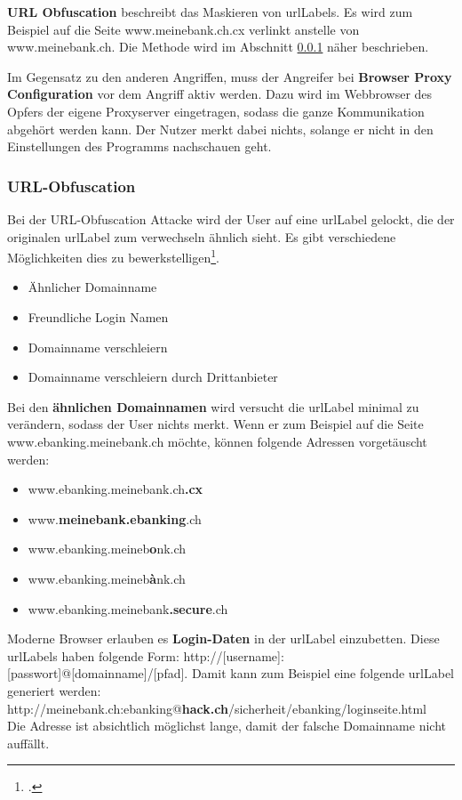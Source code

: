 \textbf{URL Obfuscation} beschreibt das Maskieren von \Glspl{urlLabel}. Es wird zum Beispiel auf die Seite www.meinebank.ch.cx verlinkt anstelle von www.meinebank.ch. Die Methode wird im Abschnitt \ref{sec:phishing:angriffvorbereiten:attacken:urlobfuscationattacke} näher beschrieben.

Im Gegensatz zu den anderen Angriffen, muss der Angreifer bei \textbf{Browser Proxy Configuration} vor dem Angriff aktiv werden. Dazu wird im Webbrowser des Opfers der eigene Proxyserver eingetragen, sodass die ganze Kommunikation abgehört werden kann. Der Nutzer merkt dabei nichts, solange er nicht in den Einstellungen des Programms nachschauen geht.

\subsubsection{URL-Obfuscation}
\label{sec:phishing:angriffvorbereiten:attacken:urlobfuscationattacke}
Bei der URL-Obfuscation Attacke wird der User auf eine \Gls{urlLabel} gelockt, die der originalen \Gls{urlLabel} zum verwechseln ähnlich sieht. Es gibt verschiedene Möglichkeiten dies zu bewerkstelligen\footcite{NISR-WP-Phishingv101doc_2015-06-29}.
\begin{itemize}
\item Ähnlicher Domainname 
\item Freundliche Login Namen
\item Domainname verschleiern
\item Domainname verschleiern durch Drittanbieter
\end{itemize}

Bei den \textbf{ähnlichen Domainnamen} wird versucht die \Gls{urlLabel} minimal zu verändern, sodass der User nichts merkt. Wenn er zum Beispiel auf die Seite www.ebanking.meinebank.ch möchte, können folgende Adressen vorgetäuscht werden:
\begin{itemize}
\item www.ebanking.meinebank.ch\textbf{.cx}
\item www.\textbf{meinebank.ebanking}.ch
\item www.ebanking.meineb\textbf{o}nk.ch
\item www.ebanking.meineb\textbf{{à}}nk.ch
\item www.ebanking.meinebank\textbf{.secure}.ch
\end{itemize}

Moderne Browser erlauben es \textbf{Login-Daten} in der \Gls{urlLabel} einzubetten. Diese \Glspl{urlLabel} haben folgende Form: http://[username]:[passwort]@[domainname]/[pfad]. Damit kann zum Beispiel eine folgende \Gls{urlLabel} generiert werden:\\
http://meinebank.ch:ebanking@\textbf{hack.ch}/sicherheit/ebanking/loginseite.html\\
Die Adresse ist absichtlich möglichst lange, damit der falsche Domainname nicht auffällt.

